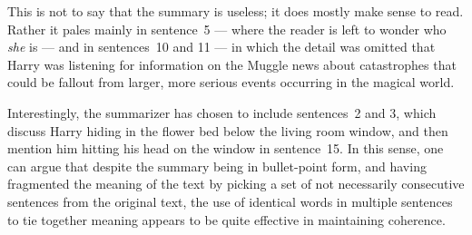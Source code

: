 This is not to say that the summary is useless; it does mostly make sense to read. Rather it pales mainly in sentence~5 --- where the reader is left to wonder who {\em she} is --- and in sentences~10 and 11 --- in which the detail was omitted that Harry was listening for information on the Muggle news about catastrophes that could be fallout from larger, more serious events occurring in the magical world.

Interestingly, the summarizer has chosen to include sentences~2 and 3, which discuss Harry hiding in the flower bed below the living room window, and then mention him hitting his head on the window in sentence~15. In this sense, one can argue that despite the summary being in bullet-point form, and having fragmented the meaning of the text by picking a set of not necessarily consecutive sentences from the original text, the use of identical words in multiple sentences to tie together meaning appears to be quite effective in maintaining coherence.

